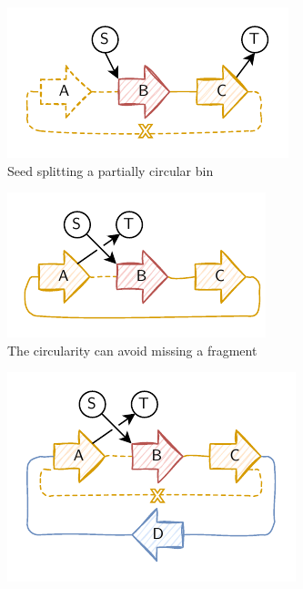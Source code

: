 \begin{figure}
  \centering
  \begin{subfigure}{0.45\linewidth}
    \centering
    \includegraphics[width=\linewidth]{pbf_iterbin/img/pbf_iterbin-middle_seed_splits_partially_circular_plasmid.pdf}
    \caption{Seed splitting a partially circular bin}\label{subfig:pbf_iterbin:middle_seed_splits_partially_circular_plasmid}
  \end{subfigure}
  \hfill
  \begin{subfigure}{0.45\linewidth}
    \centering
    \includegraphics[width=\linewidth]{pbf_iterbin/img/pbf_iterbin-true_circularity_seed_robust.pdf}
    \caption{The circularity can avoid missing a fragment}\label{subfig:pbf_iterbin:true_circularity_seed_robust}
  \end{subfigure}
  \hfill
  \begin{subfigure}{\linewidth}
    \centering
    \includegraphics[width=0.45\linewidth]{pbf_iterbin/img/pbf_iterbin-circularity_artefact.pdf}

\end{subfigure}
\end{figure}
